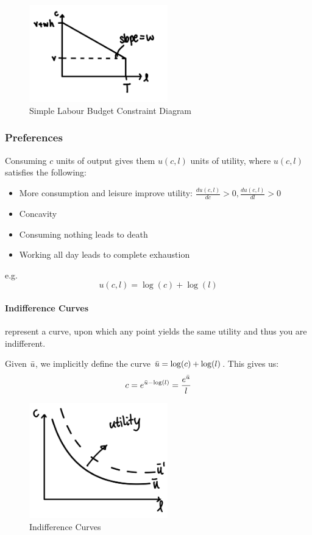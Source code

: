 \documentclass[11pt]{article}
\begin{document}
\begin{figure}[h]
    \centering
    \includegraphics[width=6cm]{photos/labour bc.jpeg}
    \caption{Simple Labour Budget Constraint Diagram}
    \label{fig:labour bc}
\end{figure}

\subsubsection{Preferences}

Consuming $c$ units of output gives them $u(c,l)$ units of utility, where $u(c,l)$ satisfies the following:
\begin{itemize}
    \item More consumption and leisure improve utility: $\frac{du(c,l)}{dc}>0, \frac{du(c,l)}{dl}>0$ 
    \item Concavity
    \item Consuming nothing leads to death
    \item Working all day leads to complete exhaustion
\end{itemize}

e.g.
\begin{equation}
\label{log example}
    u(c,l) = \log (c) + \log (l)
\end{equation}

\paragraph{Indifference Curves} represent a curve, upon which any point yields the same utility and thus you are indifferent.

Given $\Bar{u}$, we implicitly define the curve $\Bar{u} = \log (c) + \log (l)$. This gives us:
\[c = e^{\Bar{u}-\log(l)} = \frac{e^{\Bar{u}}}{l}\]

\begin{figure}[h]
    \centering
    \includegraphics[width=6cm]{photos/indifference curve.jpeg}
    \caption{Indifference Curves}
    \label{fig:indifference}
\end{figure}
\end{document}
